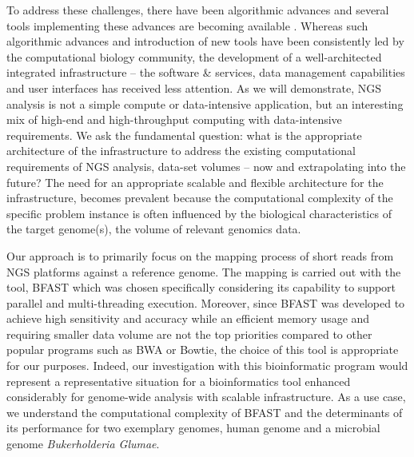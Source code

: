 \documentclass{acm_proc_article-sp}
\begin{document}

To address these challenges, there have been algorithmic advances and
several tools implementing these advances are becoming available
\cite{trapnell2009,bfast2009,scheibye-alsing2009,pepke2009,samtools}.
Whereas such algorithmic advances and introduction of new tools have
been consistently led by the computational biology community, the
development of a well-architected integrated infrastructure -- the
software \& services, data management capabilities and user interfaces
has received less attention.  As we will demonstrate, NGS analysis is
not a simple compute or data-intensive application, but an interesting
mix of high-end and high-throughput computing with data-intensive
requirements.  We ask the fundamental question: what is the
appropriate architecture of the infrastructure to address the existing
computational requirements of NGS analysis, data-set volumes -- now
and extrapolating into the future?  The need for an appropriate
scalable and flexible architecture for the infrastructure, becomes
prevalent because the computational complexity of the specific problem
instance is often influenced by the biological characteristics of the
target genome(s), the volume of relevant genomics data.


Our approach is to primarily focus on the mapping process of short
reads from NGS platforms against a reference genome.  The mapping is
carried out with the tool, BFAST\cite{bfast2009, bfast2009b} which was
chosen specifically considering its capability to support parallel and
multi-threading execution.  Moreover, since BFAST was developed to achieve high sensitivity and accuracy while an efficient memory usage and requiring smaller data volume are not the top priorities compared to other popular programs such as BWA or Bowtie\cite{bfast2009}, the choice of this tool is appropriate for our purposes. Indeed, our investigation with this bioinformatic program would represent a representative situation for a bioinformatics tool
enhanced considerably for genome-wide analysis with scalable infrastructure.  As a use case, we
understand the computational complexity of BFAST\cite{bfast2009,
  bfast2009b} and the determinants of its performance for two
exemplary genomes, human genome and a microbial genome {\it
  Bukerholderia Glumae}.
 
\end{document}
